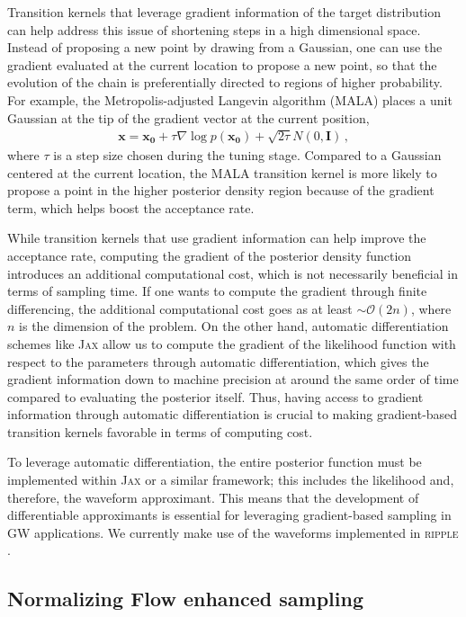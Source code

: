\documentclass[twocolumn]{aastex631}
\begin{document}
Transition kernels that leverage gradient information of the target
distribution can help address this issue of shortening steps in a high
dimensional space. Instead of proposing a new point by drawing from a Gaussian,
one can use the gradient evaluated at the current location to propose a new
point, so that the evolution of the chain is preferentially directed to regions
of higher probability. For example, the Metropolis-adjusted Langevin algorithm
(MALA) \cite{10.2307/2346184} places a unit Gaussian at the tip of the gradient
vector at the current position,
\begin{align}
    \mathbf{x} = \mathbf{x_0} + \tau \nabla\log{p(\mathbf{x_0})} + \sqrt{2\tau}N(0,\mathbf{I})\, ,
\end{align}
where $\tau$ is a step size chosen during the tuning stage. Compared to a
Gaussian centered at the current location, the MALA transition kernel is more
likely to propose a point in the higher posterior density region because of
the gradient term, which helps boost the acceptance rate.

While transition kernels that use gradient information can help improve the
acceptance rate, computing the gradient of the posterior density function
introduces an additional computational cost, which is not necessarily
beneficial in terms of sampling time. If one wants to compute the gradient
through finite differencing, the additional computational cost goes as at least
${\sim} \mathcal{O}(2n)$, where $n$ is the dimension of the problem. On the
other hand, automatic differentiation schemes like \textsc{Jax}
\cite{jax2018github} allow us to compute the gradient of the likelihood
function with respect to the parameters through automatic differentiation,
which gives the gradient information down to machine precision at around the
same order of time compared to evaluating the posterior itself. Thus, having
access to gradient information through automatic differentiation is crucial to
making gradient-based transition kernels favorable in terms of computing cost.

To leverage automatic differentiation, the entire posterior function must be
implemented within \textsc{Jax} or a similar framework; this includes the
likelihood and, therefore, the waveform approximant.  This means that the
development of differentiable approximants is essential for leveraging
gradient-based sampling in GW applications. We currently make use of the
waveforms implemented in \textsc{ripple} \cite{ripplepaper}.

\subsection{Normalizing Flow enhanced sampling}
\label{sec:flow}
\end{document}
